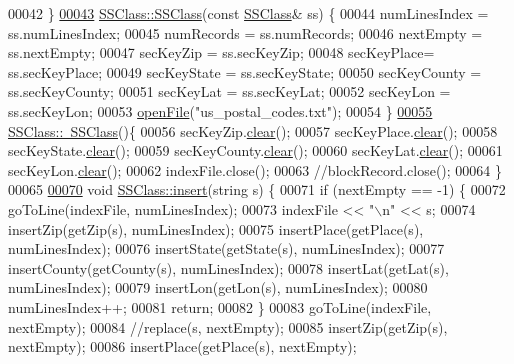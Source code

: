 \begin{DoxyCode}
00042 \}
\hyperlink{classSSClass_a5801614847b5403b1a5899150acd3b5c}{00043} \hyperlink{classSSClass_ab4603d6a236c4fa65f896a1158c0d2ef}{SSClass::SSClass}(\textcolor{keyword}{const} \hyperlink{classSSClass}{SSClass}& ss) \{
00044     numLinesIndex = ss.numLinesIndex;
00045     numRecords = ss.numRecords;
00046     nextEmpty = ss.nextEmpty;
00047     secKeyZip = ss.secKeyZip;
00048     secKeyPlace= ss.secKeyPlace;
00049     secKeyState = ss.secKeyState;
00050     secKeyCounty = ss.secKeyCounty;
00051     secKeyLat = ss.secKeyLat;
00052     secKeyLon = ss.secKeyLon;
00053     \hyperlink{classSSClass_a92e012441608ea36f3013fb3cbea9da8}{openFile}(\textcolor{stringliteral}{"us\_postal\_codes.txt"});
00054 \}
\hyperlink{classSSClass_a6e5abb04de9b90e34cc6422069ff5729}{00055} \hyperlink{classSSClass_a6e5abb04de9b90e34cc6422069ff5729}{SSClass::~SSClass}()\{
00056     secKeyZip.\hyperlink{classLinkedList_a7d1d9cf83eef67b6c4d700a3cc5970e1}{clear}();
00057     secKeyPlace.\hyperlink{classLinkedList_a7d1d9cf83eef67b6c4d700a3cc5970e1}{clear}();
00058     secKeyState.\hyperlink{classLinkedList_a7d1d9cf83eef67b6c4d700a3cc5970e1}{clear}();
00059     secKeyCounty.\hyperlink{classLinkedList_a7d1d9cf83eef67b6c4d700a3cc5970e1}{clear}();
00060     secKeyLat.\hyperlink{classLinkedList_a7d1d9cf83eef67b6c4d700a3cc5970e1}{clear}();
00061     secKeyLon.\hyperlink{classLinkedList_a7d1d9cf83eef67b6c4d700a3cc5970e1}{clear}();
00062     indexFile.close();
00063     \textcolor{comment}{//blockRecord.close();}
00064 \}
00065 
\hyperlink{classSSClass_a45c5585c784bf7c4f823f66426664aea}{00070} \textcolor{keywordtype}{void} \hyperlink{classSSClass_a45c5585c784bf7c4f823f66426664aea}{SSClass::insert}(\textcolor{keywordtype}{string} s) \{
00071     \textcolor{keywordflow}{if} (nextEmpty == -1) \{
00072         goToLine(indexFile, numLinesIndex);
00073         indexFile << \textcolor{stringliteral}{"\(\backslash\)n"} << s;
00074         insertZip(getZip(s), numLinesIndex);
00075         insertPlace(getPlace(s), numLinesIndex);
00076         insertState(getState(s), numLinesIndex);
00077         insertCounty(getCounty(s), numLinesIndex);
00078         insertLat(getLat(s), numLinesIndex);
00079         insertLon(getLon(s), numLinesIndex);
00080         numLinesIndex++;
00081         \textcolor{keywordflow}{return};
00082     \}
00083     goToLine(indexFile, nextEmpty);
00084     \textcolor{comment}{//replace(s, nextEmpty);}
00085     insertZip(getZip(s), nextEmpty);
00086     insertPlace(getPlace(s), nextEmpty);

\end{DoxyCode}
